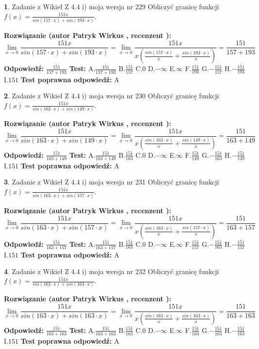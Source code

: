 \documentclass[12pt, a4paper]{article}
\theoremstyle{definition} %
\newtheorem{zad}{}
\newcommand{\zadStart}[1]{\begin{zad}#1\newline}
\newcommand{\zadStop}{\end{zad}}
\newcommand{\rozwStart}[2]{\noindent \textbf{Rozwiązanie (autor #1 , recenzent #2): }\newline}
\newcommand{\rozwStop}{\newline}
\newcommand{\odpStart}{\noindent \textbf{Odpowiedź:}\newline}
\newcommand{\odpStop}{\newline}
\newcommand{\testStart}{\noindent \textbf{Test:}\newline}
\newcommand{\testStop}{\newline}
\newcommand{\kluczStart}{\noindent \textbf{Test poprawna odpowiedź:}\newline}
\newcommand{\kluczStop}{\newline}
\begin{document}
\zadStart{Zadanie z Wikieł Z 4.4 i) moja wersja nr 229}
Obliczyć granicę funkcji $f(x)=\frac{151x}{sin(157\cdot x) +sin(193\cdot x)}$.
\zadStop
\rozwStart{Patryk Wirkus}{}
$$\lim\limits_{x\to 0}\frac{151x}{sin(157\cdot x) +sin(193\cdot x)}=\lim\limits_{x\to 0}\frac{151x}{x(\frac{sin(157\cdot x)}{x}+\frac{sin(193\cdot x)}{x})}=\frac{151}{157+193}$$
\rozwStop
\odpStart
$\frac{151}{157+193}$
\odpStop
\testStart
A.$\frac{151}{157+193}$
B.$\frac{151}{157}$
C.$0$
D.$-\infty$
E.$\infty$
F.$\frac{151}{193}$
G.$-\frac{151}{157}$
H.$-\frac{151}{193}$
I.$151$
\testStop
\kluczStart
A
\kluczStop



\zadStart{Zadanie z Wikieł Z 4.4 i) moja wersja nr 230}
Obliczyć granicę funkcji $f(x)=\frac{151x}{sin(163\cdot x) +sin(149\cdot x)}$.
\zadStop
\rozwStart{Patryk Wirkus}{}
$$\lim\limits_{x\to 0}\frac{151x}{sin(163\cdot x) +sin(149\cdot x)}=\lim\limits_{x\to 0}\frac{151x}{x(\frac{sin(163\cdot x)}{x}+\frac{sin(149\cdot x)}{x})}=\frac{151}{163+149}$$
\rozwStop
\odpStart
$\frac{151}{163+149}$
\odpStop
\testStart
A.$\frac{151}{163+149}$
B.$\frac{151}{163}$
C.$0$
D.$-\infty$
E.$\infty$
F.$\frac{151}{149}$
G.$-\frac{151}{163}$
H.$-\frac{151}{149}$
I.$151$
\testStop
\kluczStart
A
\kluczStop



\zadStart{Zadanie z Wikieł Z 4.4 i) moja wersja nr 231}
Obliczyć granicę funkcji $f(x)=\frac{151x}{sin(163\cdot x) +sin(157\cdot x)}$.
\zadStop
\rozwStart{Patryk Wirkus}{}
$$\lim\limits_{x\to 0}\frac{151x}{sin(163\cdot x) +sin(157\cdot x)}=\lim\limits_{x\to 0}\frac{151x}{x(\frac{sin(163\cdot x)}{x}+\frac{sin(157\cdot x)}{x})}=\frac{151}{163+157}$$
\rozwStop
\odpStart
$\frac{151}{163+157}$
\odpStop
\testStart
A.$\frac{151}{163+157}$
B.$\frac{151}{163}$
C.$0$
D.$-\infty$
E.$\infty$
F.$\frac{151}{157}$
G.$-\frac{151}{163}$
H.$-\frac{151}{157}$
I.$151$
\testStop
\kluczStart
A
\kluczStop



\zadStart{Zadanie z Wikieł Z 4.4 i) moja wersja nr 232}
Obliczyć granicę funkcji $f(x)=\frac{151x}{sin(163\cdot x) +sin(163\cdot x)}$.
\zadStop
\rozwStart{Patryk Wirkus}{}
$$\lim\limits_{x\to 0}\frac{151x}{sin(163\cdot x) +sin(163\cdot x)}=\lim\limits_{x\to 0}\frac{151x}{x(\frac{sin(163\cdot x)}{x}+\frac{sin(163\cdot x)}{x})}=\frac{151}{163+163}$$
\rozwStop
\odpStart
$\frac{151}{163+163}$
\odpStop
\testStart
A.$\frac{151}{163+163}$
B.$\frac{151}{163}$
C.$0$
D.$-\infty$
E.$\infty$
F.$\frac{151}{163}$
G.$-\frac{151}{163}$
H.$-\frac{151}{163}$
I.$151$
\testStop
\kluczStart
A
\kluczStop
\end{document}
